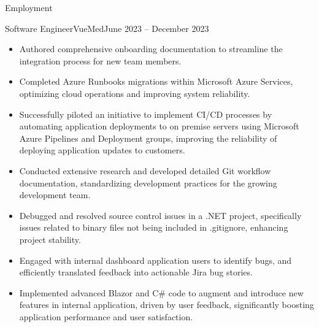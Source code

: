 \documentclass[]{mcdowellcv}
\begin{document}
	\makeheader
	
	\begin{cvsection}{Employment}
		\begin{cvsubsection}{Software Engineer}{VueMed}{June 2023 -- December 2023}			
			\begin{itemize}
				\item Authored comprehensive onboarding documentation to streamline the integration process for new team members.
				\item Completed Azure Runbooks migrations within Microsoft Azure Services, optimizing cloud operations and improving system reliability.
				\item Successfully piloted an initiative to implement CI/CD processes by automating application deployments to on premise servers using Microsoft Azure Pipelines and Deployment groups, improving the reliability of deploying application updates to customers. 
				\item Conducted extensive research and developed detailed Git workflow documentation, standardizing development practices for the growing development team.
				\item Debugged and resolved source control issues in a .NET project, specifically issues related to binary files not being included in .gitignore, enhancing project stability.
				\item Engaged with internal dashboard application users to identify bugs, and efficiently translated feedback into actionable Jira bug stories.
				\item Implemented advanced Blazor and C\# code to augment and introduce new features in internal application, driven by user feedback, significantly boosting application performance and user satisfaction.
			\end{itemize}
		\end{cvsubsection}
		

\end{cvsection}
\end{document}

